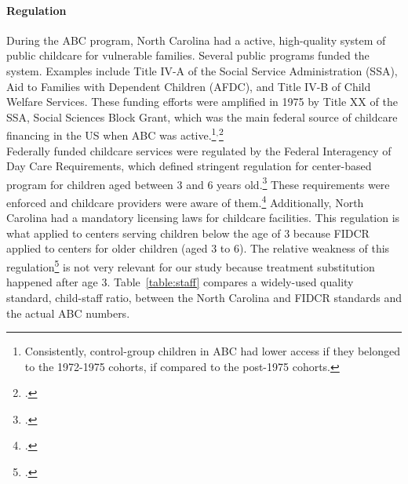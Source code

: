 \paragraph{Regulation}

\noindent During the ABC program, North Carolina had a active, high-quality system of public childcare for vulnerable families. Several public programs funded the system. Examples include Title IV-A of the Social Service Administration (SSA), Aid to Families with Dependent Children (AFDC), and Title IV-B of Child Welfare Services. These funding efforts were amplified in 1975 by Title XX of the SSA, Social Sciences Block Grant, which was the main federal source of childcare financing in the US when ABC was active.\footnote{Consistently, control-group children in ABC had lower access if they belonged to the 1972-1975 cohorts, if compared to the post-1975 cohorts.}$^{,}$\footnote{\citet{Robins_1988_Federal-Child-Care}.}\\

\noindent Federally funded childcare services were regulated by the Federal Interagency of Day Care Requirements, which defined stringent regulation for center-based program for children aged between 3 and 6 years old.\footnote{\citet{Department-of-Health_1968_DayCareRequirements}.} These requirements were enforced and childcare providers were aware of them.\footnote{\citet{Kuperman_2015_Clifford-Russell-Interview}.} Additionally, North Carolina had a mandatory licensing laws for childcare facilities. This regulation is what applied to centers serving children below the age of 3 because FIDCR applied to centers for older children (aged 3 to 6). The relative weakness of this regulation\footnote{\citet{NCGA_1971_House-Bill-100}.} is not very relevant for our study because treatment substitution happened after age 3. Table~\ref{table:staff} compares a widely-used quality standard, child-staff ratio, between the North Carolina and FIDCR standards and the actual ABC numbers.

